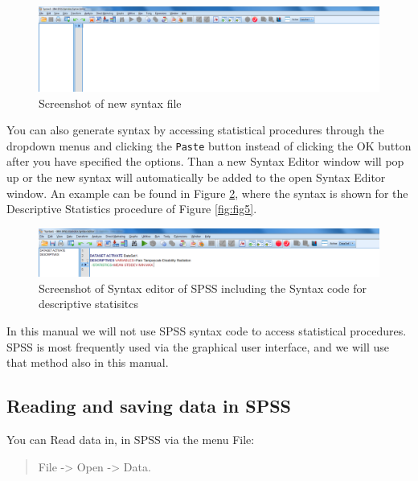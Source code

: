 \documentclass[]{book}
\begin{document}
\begin{figure}

{\centering \includegraphics[width=0.95\linewidth]{images/fig1.6} 

}

\caption{Screenshot of new syntax file}\label{fig:fig6}
\end{figure}

You can also generate syntax by accessing statistical procedures through
the dropdown menus and clicking the \texttt{Paste} button instead of
clicking the OK button after you have specified the options. Than a new
Syntax Editor window will pop up or the new syntax will automatically be
added to the open Syntax Editor window. An example can be found in
Figure \ref{fig:fig7}, where the syntax is shown for the Descriptive
Statistics procedure of Figure \ref{fig:fig5}.

\begin{figure}

{\centering \includegraphics[width=0.95\linewidth]{images/fig1.7} 

}

\caption{Screenshot of Syntax editor of SPSS including the Syntax code for descriptive statisitcs}\label{fig:fig7}
\end{figure}

In this manual we will not use SPSS syntax code to access statistical
procedures. SPSS is most frequently used via the graphical user
interface, and we will use that method also in this manual.

\subsection{Reading and saving data in
SPSS}\label{reading-and-saving-data-in-spss}

You can Read data in, in SPSS via the menu File:

\begin{quote}
File -\textgreater{} Open -\textgreater{} Data.
\end{quote}
\end{document}
